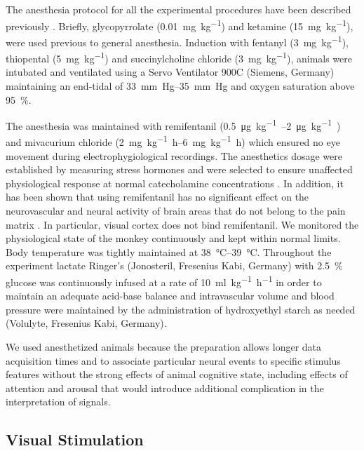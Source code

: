 The anesthesia protocol for all the experimental procedures have been described previously \citep{Logothetis1999,Logothetis2001}.
Briefly, glycopyrrolate (\SI{0.01}{mg.{kg}^{-1}}) and ketamine (\SI{15}{mg.{kg}^{-1}}), were used previous to general anesthesia.
Induction with fentanyl (\SI{3}{mg.{kg}^{-1}}), thiopental (\SI{5}{mg.{kg}^{-1}}) and succinylcholine chloride (\SI{3}{mg.{kg}^{-1}}), animals were intubated and ventilated using a Servo Ventilator 900C (Siemens, Germany) maintaining an end-tidal  of \SIrange{33}{35}{mm.Hg} and oxygen saturation above \SI{95}{\percent}.

The anesthesia was maintained with remifentanil (\SIrange{0.5}{2}{\micro\gram.kg^{-1}.\min}) and mivacurium chloride (\SIrange{2}{6}{mg.kg^{-1}.h}) which ensured no eye movement during electrophygiological recordings.
The anesthetics dosage were established by measuring stress hormones and were selected to ensure unaffected physiological response at normal catecholamine concentrations \citep{Logothetis1999}.
In addition, it has been shown that using remifentanil has no significant effect on the neurovascular and neural activity of brain areas that do not belong to the pain matrix \citep{Goense2008,Zappe2008}.
In particular, visual cortex does not bind remifentanil.
We monitored the physiological state of the monkey continuously and kept within normal limits.
Body temperature was tightly maintained at \SIrange{38}{39}{\celsius}.
Throughout the experiment lactate Ringer's (Jonosteril, Fresenius Kabi, Germany) with \SI{2.5}{\percent} glucose was continuously infused at a rate of \SI{10}{ml.kg^{-1}.h^{-1}} in order to maintain an adequate acid-base balance and intravascular volume and blood pressure were maintained by the administration of hydroxyethyl starch as needed (Volulyte, Fresenius Kabi, Germany).

We used anesthetized animals because the preparation allows longer data acquisition times and to associate particular neural events to specific stimulus features without the strong effects of animal cognitive state, including effects of attention and arousal that would introduce additional complication in the interpretation of signals.


\subsection{Visual Stimulation}

